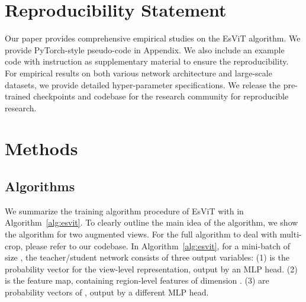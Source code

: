 \documentclass{article} \usepackage{iclr2022_conference,times}
\newcommand{\shortname}{EsViT}
\begin{document}
\section*{Reproducibility Statement}
Our paper provides comprehensive empirical studies on the \shortname{} algorithm. 
We provide PyTorch-style pseudo-code in Appendix. We also include an example code with instruction as supplementary material to ensure the reproducibility. 
For empirical results on both various network architecture and large-scale datasets, we provide detailed hyper-parameter specifications.
We release the pre-trained checkpoints and codebase for the research community for reproducible research.
 





\newpage
\appendix


\appendix






\section{Methods}

\subsection{Algorithms}
We summarize the training algorithm procedure of \shortname{}  with  in Algorithm~\ref{alg:esvit}. To clearly outline the main idea of the algorithm, we show the algorithm for two augmented views. For the full algorithm to deal with multi-crop, please refer to our codebase. In Algorithm~\ref{alg:esvit}, for a mini-batch of size , the teacher/student network consists of three output variables:
(1)  is the probability vector for the view-level representation, output by an MLP head. 
(2)  is the feature map, containing  region-level features of dimension . 
(3)  are probability vectors of , output by a different MLP head.
\end{document}
